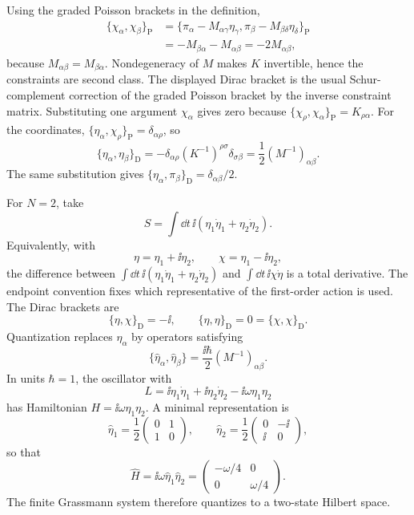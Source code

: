 Using the graded Poisson brackets in the definition,
\[
\begin{aligned}
  \{\chi_\alpha,\chi_\beta\}_{\mathrm P}
  &=
  \{\pi_\alpha-M_{\alpha\gamma}\eta_\gamma,
    \pi_\beta-M_{\beta\delta}\eta_\delta\}_{\mathrm P} \\
  &=
  -M_{\beta\alpha}-M_{\alpha\beta}
   =
  -2M_{\alpha\beta},
\end{aligned}
\]
because \(M_{\alpha\beta}=M_{\beta\alpha}\).  Nondegeneracy of \(M\) makes
\(K\) invertible, hence the constraints are second class.  The displayed
Dirac bracket is the usual Schur-complement correction of the graded Poisson
bracket by the inverse constraint matrix.  Substituting one argument
\(\chi_\alpha\) gives zero because
\(\{\chi_\rho,\chi_\alpha\}_{\mathrm P}=K_{\rho\alpha}\).
For the coordinates,
\(\{\eta_\alpha,\chi_\rho\}_{\mathrm P}=\delta_{\alpha\rho}\), so
\[
  \{\eta_\alpha,\eta_\beta\}_{\mathrm D}
  =
  -\delta_{\alpha\rho}(K^{-1})^{\rho\sigma}
  \delta_{\sigma\beta}
  =
  \frac12(M^{-1})_{\alpha\beta}.
\]
The same substitution gives
\(\{\eta_\alpha,\pi_\beta\}_{\mathrm D}=\delta_{\alpha\beta}/2\).

For \(N=2\), take
\[
  S=\int\dd t\,\ii(\eta_1\dot\eta_1+\eta_2\dot\eta_2).
\]
Equivalently, with
\[
  \eta=\eta_1+\ii\eta_2,
  \qquad
  \chi=\eta_1-\ii\eta_2,
\]
the difference between
\(\int\dd t\,\ii(\eta_1\dot\eta_1+\eta_2\dot\eta_2)\) and
\(\int\dd t\,\ii\chi\dot\eta\) is a total derivative. The endpoint convention
fixes which representative of the first-order action is used. The Dirac
brackets are
\[
  \{\eta,\chi\}_{\mathrm D}=-\ii,
  \qquad
  \{\eta,\eta\}_{\mathrm D}=0=\{\chi,\chi\}_{\mathrm D}.
\]
Quantization replaces \(\eta_\alpha\) by operators satisfying
\[
  \{\widehat\eta_\alpha,\widehat\eta_\beta\}
  =
  \frac{\ii\hbar}{2}(M^{-1})_{\alpha\beta}.
\]
In units \(\hbar=1\), the oscillator with
\[
  L=\ii\eta_1\dot\eta_1+\ii\eta_2\dot\eta_2-\ii\omega\eta_1\eta_2
\]
has Hamiltonian \(H=\ii\omega\eta_1\eta_2\). A minimal representation is
\[
  \widehat\eta_1
  =
  \frac12
  \begin{pmatrix}0&1\\1&0\end{pmatrix},
  \qquad
  \widehat\eta_2
  =
  \frac12
  \begin{pmatrix}0&-\ii\\ \ii&0\end{pmatrix},
\]
so that
\[
  \widehat H
  =
  \ii\omega\widehat\eta_1\widehat\eta_2
  =
  \begin{pmatrix}
    -\omega/4&0\\0&\omega/4
  \end{pmatrix}.
\]
The finite Grassmann system therefore quantizes to a two-state Hilbert space.

